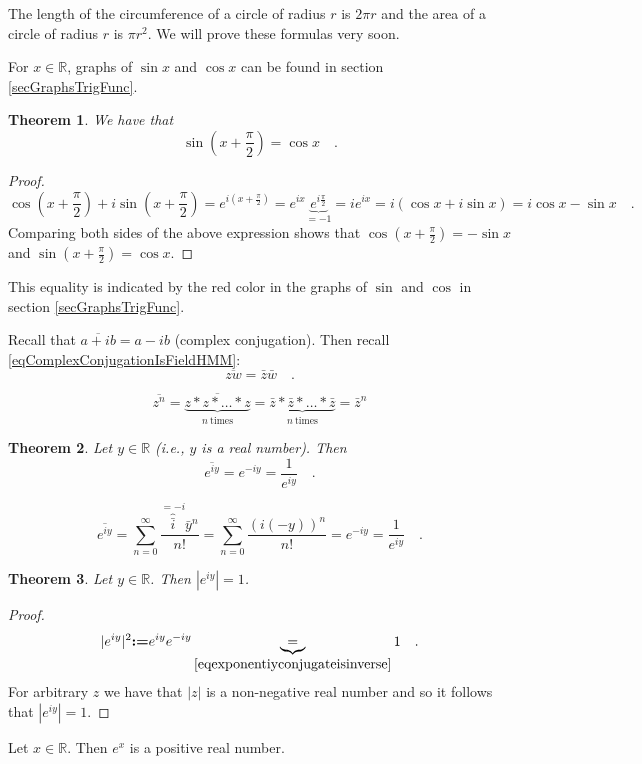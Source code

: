 \documentclass[12pt]{book}
\newcommand{\eqdef}{\textbf{:=}}
\newtheorem{theorem}{Theorem}[section]
\begin{document}
The length of the circumference of a circle of radius $r$ is $2\pi r$ and the area of a circle of radius $r$ is $\pi r^2$. We will prove these formulas very soon.

For $x\in \mathbb R$, graphs of $\sin x$ and $\cos x$ can be found in section \ref{secGraphsTrigFunc}.
\begin{theorem} We have that
\[
\sin \left(x+\frac{\pi}{2}\right)= \cos x \quad .
\]
\end{theorem}

\begin{proof}
\[
\cos\left(x+\frac{\pi}{2}\right)+ i\sin \left(x+\frac{\pi}2\right)=e^{i(x+\frac{\pi}{2})}= e^{ix} \underbrace{e^{ i\frac{\pi}2 }}_{=-1}= ie^{ix}= i(\cos x + i \sin x)= i\cos x- \sin x\quad .
\]
Comparing both sides of the above expression shows that $\cos(x+\frac{\pi}{2})=-\sin x$ and $\sin(x+\frac{\pi}{2})= \cos x$.
\end{proof}
This equality is indicated by the red color in the graphs of $\sin$ and $\cos$ in section \ref{secGraphsTrigFunc}.

Recall that $\overline{a+ib}=a-ib$  (complex conjugation). Then recall \eqref{eqComplexConjugationIsFieldHMM}:
\[
\overline {z w}= \bar z \bar w\quad .
\]

\[
\overline {z^n}= \overline {\underbrace{z*z*\dots*z}_{n\mathrm{~times}}} = \underbrace{\bar z* \bar z *\dots * \bar z}_{n\mathrm{~times}}= \bar {z}^n
\]

\begin{theorem}
Let $y\in \mathbb R$ (i.e., $y$ is a real number). Then
\begin{equation}\label{eqexponentiyconjugateisinverse}
\overline {e^{iy}}=e^{-iy}= \frac{1}{e^{iy}}\quad .
\end{equation}
\end{theorem}
\[
\overline {e^{iy}}= \sum_{n=0}^\infty \frac{\overbrace{\bar i}^{=-i} \bar y^n }{ n! }= \sum_{n=0}^\infty \frac{(i(-y))^n}{n!}=  e^{-iy}= \frac{1}{e^{iy}}\quad .
\]
\begin{theorem}
Let $y\in \mathbb R$. Then $|e^{iy}|=1$.
\end{theorem}
\begin{proof}
\[
|e^{iy}|^2 \eqdef e^{iy}e^{-iy}\underbrace{ =}_{ \eqref{eqexponentiyconjugateisinverse}} 1 \quad .
\]
For arbitrary $z$ we have that $|z|$ is a non-negative real number and so it follows that $|e^{iy}|=1$.
\end{proof}

\begin{proposition}
Let $x\in \mathbb R$. Then $e^x$ is a positive real number.
\end{proposition}
\end{document}
